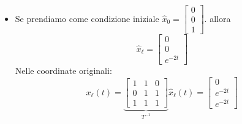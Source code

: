 \documentclass{article}
\numberwithin{equation}{subsection}
\begin{document}
\begin{itemize}
\item Se prendiamo come condizione iniziale $\hat x_0 = \begin{bmatrix} 0\\0\\1 \end{bmatrix}$. allora
\begin{equation}
    \hat x_\ell = \begin{bmatrix} 0\\0\\e^{-2t} \end{bmatrix}
\end{equation}
Nelle coordinate originali:
\begin{equation}
    x_\ell(t) = \underbrace{\begin{bmatrix}
        1&1&0\\
        0&1&1\\
        1&1&1
    \end{bmatrix} }_{T^{-1}} \hat x_\ell (t) = 
    \begin{bmatrix}
        0\\
        e^{-2t}\\
        e^{-2t}
    \end{bmatrix}
\end{equation}

\end{itemize}
\end{document}
